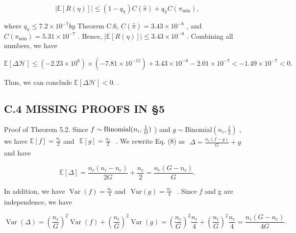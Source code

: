 \documentclass[
  10
]{article}
\begin{document}
\[
| \mathbb {E} [ R (\eta) ] | \leq (1 - q _ {\hat {\pi}}) C (\hat {\pi}) + q _ {\hat {\pi}} C (\pi_ {\min}),
\]

where \(q _ { \hat { \pi } } \leq 7 . 2 \times 1 0 ^ { - 7 } b y\)
Theorem C.6, \(C ( \hat { \pi } ) = 3 . 4 3 \times 1 0 ^ { - 8 }\) , and
\(C ( \pi _ { \mathrm { m i n } } ) = 5 . 3 1 \times 1 0 ^ { - 7 }\) .
Hence,
\(| \mathbb { E } [ R ( \eta ) ] | \le 3 . 4 3 \times 1 0 ^ { - 8 }\) .
Combining all numbers, we have

\[
\mathbb {E} [ \Delta \mathcal {H} ] \leq (- 2. 2 3 \times 1 0 ^ {6}) \times (- 7. 8 1 \times 1 0 ^ {- 1 5}) + 3. 4 3 \times 1 0 ^ {- 8} - 2. 0 1 \times 1 0 ^ {- 7} <   - 1. 4 9 \times 1 0 ^ {- 7} <   0.
\]

Thus, we can conclude \(\mathbb { E } [ \Delta \mathcal { H } ] < 0 .\)
.

\subsection{C.4 MISSING PROOFS IN §5}\label{c.4-missing-proofs-in-5}

Proof of Theorem 5.2. Since
\(f \sim \mathrm { B i n o m i a l } ( n _ { i } , { \frac { 1 } { \it \Omega } } )\)
) and
\(g \sim \mathrm { B i n o m i a l } ( n _ { c } , \frac { 1 } { 2 } )\)
, we have
\(\textstyle \mathbb { E } [ f ] = { \frac { n _ { i } } { 2 } }\) and
\(\begin{array} { r } { \mathbb { E } [ g ] = \frac { n _ { c } } { 2 } } \end{array}\)
. We rewrite Eq. (8) as
\(\begin{array} { r } { \Delta = \frac { n _ { c } ( f - g ) } { G } + g } \end{array}\)
and have

\[
\mathbb {E} [ \Delta ] = \frac {n _ {c} (n _ {i} - n _ {c})}{2 G} + \frac {n _ {c}}{2} = \frac {n _ {c} (G - n _ {c})}{G}.
\]

In addition, we have
\(\textstyle \operatorname { V a r } ( f ) = { \frac { n _ { i } } { 4 } }\)
and
\(\begin{array} { r } { \mathrm { V a r } ( g ) = \frac { n _ { c } } { 4 } } \end{array}\)
. Since \(f\) and g are independence, we have

\[
\operatorname{Var} (\Delta) = \left(\frac {n _ {c}}{G}\right) ^ {2} \operatorname{Var} (f) + \left(\frac {n _ {i}}{G}\right) ^ {2} \operatorname{Var} (g) = \left(\frac {n _ {c}}{G}\right) ^ {2} \frac {n _ {i}}{4} + \left(\frac {n _ {i}}{G}\right) ^ {2} \frac {n _ {c}}{4} = \frac {n _ {c} (G - n _ {c})}{4 G}.
\]
\end{document}
